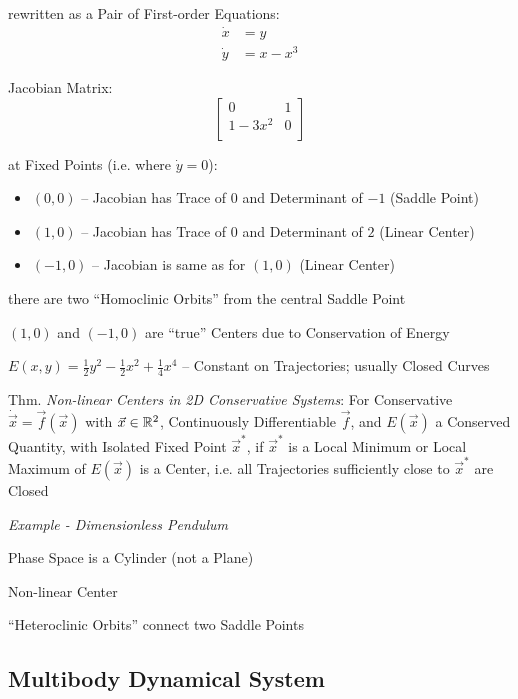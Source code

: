 rewritten as a Pair of First-order Equations:
\begin{align*}
  \dot{x} & = y \\
  \dot{y} & = x - x^3
\end{align*}

Jacobian Matrix:
\[
  \begin{bmatrix}
    0        & 1 \\
    1 - 3x^2 & 0 \\
  \end{bmatrix}
\]

at Fixed Points (i.e. where $\dot{y} = 0$):
\begin{itemize}
  \item $(0,0)$ -- Jacobian has Trace of $0$ and Determinant of $-1$ (Saddle
    Point)
  \item $(1,0)$ -- Jacobian has Trace of $0$ and Determinant of $2$ (Linear
    Center)
  \item $(-1,0)$ -- Jacobian is same as for $(1,0)$ (Linear Center)
\end{itemize}

there are two ``Homoclinic Orbits'' from the central Saddle Point

$(1,0)$ and $(-1,0)$ are ``true'' Centers due to Conservation of Energy

$E(x,y) = \frac{1}{2}y^2 - \frac{1}{2}x^2 + \frac{1}{4}x^4$ -- Constant on
Trajectories; usually Closed Curves


Thm. \emph{Non-linear Centers in 2D Conservative Systems}:
For Conservative $\dot{\vec{x}} = \vec{f}(\vec{x})$ with $\vec{x} \in
\mathbb{R}^2$, Continuously Differentiable $\vec{f}$, and $E(\vec{x})$ a Conserved
Quantity, with Isolated Fixed Point $\vec{x}^*$, if $\vec{x}^*$ is a Local
Minimum or Local Maximum of $E(\vec{x})$ is a Center, i.e. all Trajectories
sufficiently close to $\vec{x}^*$ are Closed


\emph{Example - Dimensionless Pendulum}

Phase Space is a Cylinder (not a Plane)

Non-linear Center

``Heteroclinic Orbits'' connect two Saddle Points



\subsection{Multibody Dynamical System}\label{sec:multibody_system}

